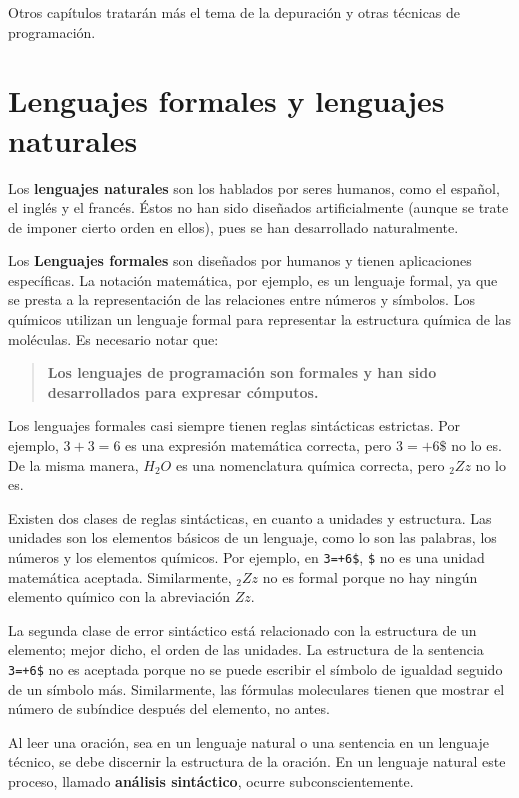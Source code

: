 
Otros capítulos tratarán más el tema de la depuración y otras técnicas
de programación.

\section{Lenguajes formales y lenguajes naturales}

  

Los \textbf{lenguajes naturales} son los hablados por seres humanos,
como el español, el inglés y el francés. Éstos no han sido diseñados
artificialmente (aunque se trate de imponer cierto orden en ellos),
pues se han desarrollado naturalmente.

Los \textbf{Lenguajes formales} son diseñados por humanos y tienen
aplicaciones específicas. La notación matemática, por ejemplo, es
un lenguaje formal, ya que se presta a la representación de las relaciones
entre números y símbolos. Los químicos utilizan un lenguaje formal
para representar la estructura química de las moléculas. Es necesario
notar que:
\begin{quote}
\textbf{Los lenguajes de programación son formales y han sido desarrollados
para expresar cómputos.} 
\end{quote}
Los lenguajes formales casi siempre tienen reglas sintácticas estrictas.
Por ejemplo, $3+3=6$ es una expresión matemática correcta, pero $3=+6\$$
no lo es. De la misma manera, $H_{2}O$ es una nomenclatura química
correcta, pero $_{2}Zz$ no lo es.

Existen dos clases de reglas sintácticas, en cuanto a unidades y estructura.
Las unidades son los elementos básicos de un lenguaje, como lo son
las palabras, los números y los elementos químicos. Por ejemplo, en
\texttt{3=+6\$}, \texttt{\$} no es una unidad matemática aceptada.
Similarmente, $_{2}Zz$ no es formal porque no hay ningún elemento
químico con la abreviación $Zz$.

La segunda clase de error sintáctico está relacionado con la estructura
de un elemento; mejor dicho, el orden de las unidades. La estructura
de la sentencia \texttt{3=+6\$} no es aceptada porque no se puede
escribir el símbolo de igualdad seguido de un símbolo más. Similarmente,
las fórmulas moleculares tienen que mostrar el número de subíndice
después del elemento, no antes.

Al leer una oración, sea en un lenguaje natural o una sentencia en
un lenguaje técnico, se debe discernir la estructura de la oración.
En un lenguaje natural este proceso, llamado \textbf{análisis sintáctico},
ocurre subconscientemente.

